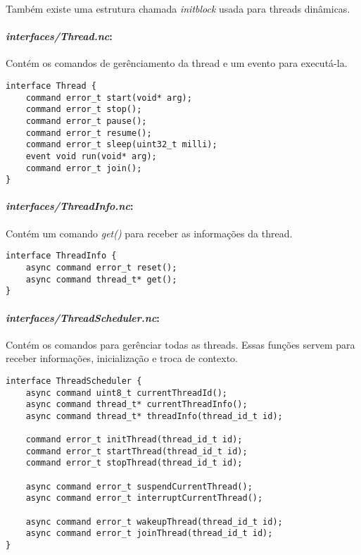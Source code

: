 \documentclass[a4paper,onecolumn, 10pt]{article}
\begin{document}
Também existe uma estrutura chamada \textit{initblock} usada para threads dinâmicas.
\paragraph{\textit{interfaces/Thread.nc}:} Contém os comandos de gerênciamento da thread e um evento para executá-la.
\begin{lstlisting}
interface Thread {
    command error_t start(void* arg);
    command error_t stop();
    command error_t pause();
    command error_t resume();
    command error_t sleep(uint32_t milli);
    event void run(void* arg);
    command error_t join();
}  
\end{lstlisting}
\paragraph{\textit{interfaces/ThreadInfo.nc}:} Contém um comando \textit{get()} para receber as informações da thread.
\begin{lstlisting}
interface ThreadInfo {
    async command error_t reset();
    async command thread_t* get();
} 
\end{lstlisting}
\paragraph{\textit{interfaces/ThreadScheduler.nc}:} Contém os comandos para gerênciar todas as threads. Essas funções
servem para receber informações, inicialização e troca de contexto.
\begin{lstlisting}
interface ThreadScheduler {
    async command uint8_t currentThreadId();
    async command thread_t* currentThreadInfo();
    async command thread_t* threadInfo(thread_id_t id);

    command error_t initThread(thread_id_t id);
    command error_t startThread(thread_id_t id);
    command error_t stopThread(thread_id_t id);

    async command error_t suspendCurrentThread();
    async command error_t interruptCurrentThread();

    async command error_t wakeupThread(thread_id_t id);
    async command error_t joinThread(thread_id_t id);
}
\end{lstlisting}
\end{document}
